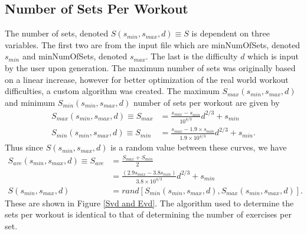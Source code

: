 \subsection{Number of Sets Per Workout}

The number of sets, denoted $S(s_{min},s_{max},d) \equiv S$ is dependent on three variables. The first two are from the input file which are minNumOfSets, denoted $s_{min}$ and minNumOfSets, denoted $s_{max}$. The last is the difficulty $d$ which is input by the user upon generation. The maximum number of sets was originally based on a linear increase, however for better optimization of the real world workout difficulties, a custom algorithm was created. The maximum $S_{max}(s_{min},s_{max},d)$ and minimum $S_{min}(s_{min},s_{max},d)$ number of sets per workout are given by
\begin{align}
S_{max}(s_{min},s_{max},d) \equiv S_{max}&= \frac{s_{max}-s_{min}}{10^{4/3}} d^{2/3}+s_{min} \\
S_{min}(s_{min},s_{max},d) \equiv S_{min}&= \frac{s_{max}-1.9 \times s_{min}}{1.9 \times 10^{4/3}} d^{2/3}+s_{min}.
\end{align}
Thus since $S(s_{min},s_{max},d)$ is a random value between these curves, we have
\begin{align}
S_{ave}(s_{min},s_{max},d) \equiv S_{ave} &= \frac{S_{max}+ S_{min}}{2} \\ &= \frac{\left(2.9s_{max}-3.8s_{min}\right)}{3.8 \times 10^{4/3}}d^{2/3}+s_{min} \\
S(s_{min},s_{max},d) &= rand[S_{min}(s_{min},s_{max},d),S_{max}(s_{min},s_{max},d)].
\end{align}
These are shown in Figure \ref{Svd and Evd}. The algorithm used to determine the sets per workout is identical to that of determining the number of exercises per set.

